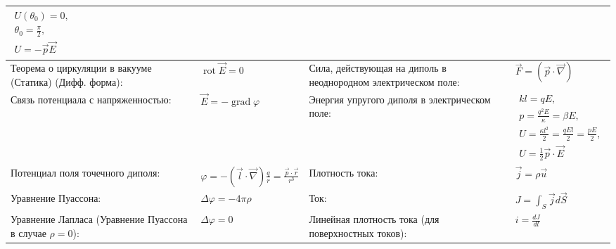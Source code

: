 \documentclass{article}
\begin{document}
\begin{tabular}{ |p{6cm}|p{3.5cm}|p{6cm}|p{3.5cm}|  }
$\begin{aligned}
U\left(\theta_{0}\right)=0,             \\
\theta_{0} = \frac{\pi}{2},             \\
U=-\vec{p} \vec{E}
\end{aligned}$                                                             \\
\hline
Теорема о циркуляции в вакууме (Статика) (Дифф. форма):                    &
$\operatorname{rot} {\vec E}=0$                                            &
Сила, действующая на диполь в неоднородном электрическом поле:             &
$\vec{F}=(\vec{p} \cdot \vec\nabla)$                                       \\
\hline
Связь потенциала с напряженностью:                                         &
$\vec E=-\operatorname{grad} \varphi$                                      &
Энергия упругого диполя в электрическом поле:                              &
$\begin{aligned}
k l=q E,                                                                   \\
p=\frac{q^{2} E}{\kappa}=\beta E,                                          \\
U=\frac{\kappa l^{2}}{2}=\frac{q E l}{2}=\frac{p E}{2},                    \\
U=\frac{1}{2} \vec{p} \cdot \vec{E}
\end{aligned}$                                                             \\
\hline
Потенциал поля точечного диполя:                                           &
$\varphi = -({\vec l} \cdot {\vec \nabla}) \frac{q}{r}=\frac{{\vec p} \cdot {\vec r}}{r^{3}}$ &
Плотность тока:                                                            &
$\vec{j}=\rho \vec{u}$                                                     \\
\hline
Уравнение Пуассона:                                                        &
$\Delta \varphi=-4 \pi \rho$                                               &
Ток:                                                                       &
$J=\int_{S} \vec{j} d \vec{S}$                                             \\
\hline
Уравнение Лапласа (Уравнение Пуассона в случае $\rho = 0$):                &
$\Delta \varphi=0$                                                         &
Линейная плотность тока (для поверхностных токов):                         &
$i = \frac{d{J}}{d{l}}$                                                    \\

\end{tabular}
\end{document}
